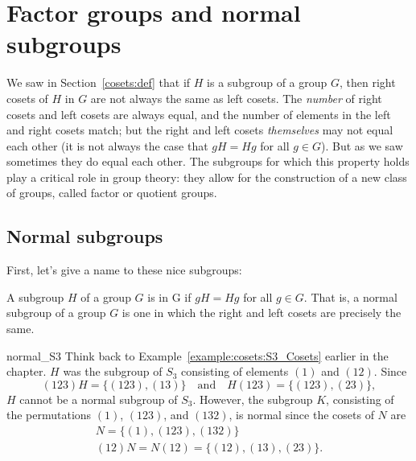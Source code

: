 {%
%
%
 
\section{Factor groups and normal subgroups}\label{cosets:normal}
 
We saw in Section~\ref{cosets:def} that if $H$ is a subgroup of a group $G$, then right cosets of $H$ in $G$ are not always the same as left cosets. The \emph{number} of right cosets and left cosets are always equal, and the number of elements in the left and right cosets match; but the right and left cosets \emph{themselves} may not equal each other (it is not always the case that $gH = Hg$ for all $g \in G$).  But as we saw sometimes they do equal each other. The subgroups for which this property holds play a critical role in group theory: they allow for the construction of a new class of groups, called factor or quotient groups. 

\subsection{Normal subgroups}

First, let's give a name to these nice subgroups:

\begin{defn}\label{normal_sub}
A subgroup $H$ of a group $G$ is  in G if $gH =
Hg$ for all $g \in G$. That is, a normal subgroup of a group $G$ is
one in which the right and left cosets are precisely the same. 
\end{defn}
 
\begin{example}{normal_S3}
Think back to Example~\ref{example:cosets:S3_Cosets} earlier in the chapter.  $H$ was the subgroup of $S_3$ consisting of elements $(1)$ and
$(12)$. Since 
\[
(123) H = \{ (123), (13) \}
\quad
\text{and}
\quad
H (123) = \{ (123), (23) \},
\]
$H$ cannot be a normal subgroup of $S_3$.  However, the subgroup $K$,
consisting of the permutations $(1)$, $(123)$, and $(132)$, is normal
since the cosets of $N$ are 
\[
\begin{array}{c}
N  =   \{ (1), (123), (132) \} \\
(12) N =  N (12)  =  \{ (12), (13), (23) \}.
\end{array}
\]
\end{example}

}
